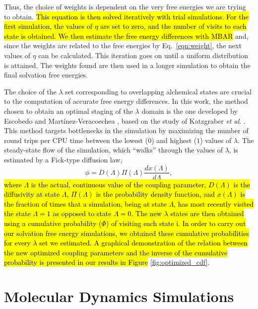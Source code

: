 \documentclass[final,12p,times,twocolumn]{elsarticle}
\begin{document}
	Thus, the choice of weights is dependent on the very free energies we are trying to obtain. \hl{This equation is then solved iteratively with trial simulations. For the first simulation, the values of $\eta$ are set to zero, and the number of visits  to each state is obtained. We then estimate the free energy differences with MBAR} \cite{mbar} and, since the weights are related to the free energies by Eq.~\eqref{eqn:weight}, the next values of $\eta$ can be calculated. This iteration goes on until a uniform distribution is attained. The weights found are then used in a longer simulation to obtain the final solvation free energies. 
	
	The choice of the $\lambda$ set corresponding to overlapping alchemical states are crucial to the computation of accurate free energy differences. In this work, the method chosen to obtain an optimal staging of the $\lambda$ domain is the one developed by Escobedo and Mart\'{i}nez-Veracoechea \cite{escobedo2007}, based on the study of Katzgraber \textit{et al}. \cite{1742-5468-2006-03-P03018}. This method targets bottlenecks in the simulation by maximizing the number of round trips per CPU time between the lowest ($0$) and highest ($1$) values of $\lambda$. The steady-state flow of the simulation, which ``walks'' through the values of $\lambda$, is estimated by a Fick-type diffusion law,
	\begin{equation}
	\phi = D(\Lambda) \Pi (\Lambda) \dfrac{dx(\Lambda)}{d \Lambda},
	\label{eqn:stream}
	\end{equation}
	\hl{where $\Lambda$ is the actual, continuous value of the coupling parameter, $D(\Lambda)$ is the diffusivity at state $\Lambda$, $\Pi(\Lambda)$ is the probability density function, and $x(\Lambda)$ is the fraction of times that a simulation, being at state $\Lambda$, has most recently visited the state $\Lambda=1$ as opposed to state $\Lambda=0$. The new $\lambda$ states are then obtained using a cumulative probability ($\Phi$) of visiting each state i. In order to carry out our solvation free energy simulations, we obtained these cumulative probabilities for every $\lambda$ set we estimated. A graphical demonstration of the relation between the new optimized coupling parameters and the inverse of the cumulative probability is presented in our results in Figure} \ref{fig:optimized_cdf}.

	\section{Molecular Dynamics Simulations}\label{mds}
\end{document}
